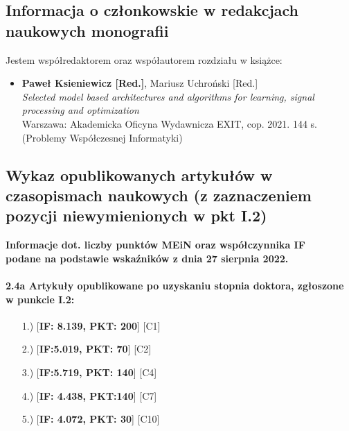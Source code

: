 \begin{fullwidth}
\subsection{Informacja o członkowskie w redakcjach naukowych monografii}

Jestem współredaktorem oraz współautorem rozdziału w książce:

\begin{itemize}
	\item \textbf{Paweł Ksieniewicz [Red.]}, Mariusz Uchroński [Red.]\\\emph{Selected model based architectures and algorithms for learning, signal processing and optimization}\\Warszawa: Akademicka Oficyna Wydawnicza EXIT, cop. 2021. 144 s. (Problemy Współczesnej Informatyki)
\end{itemize}

\subsection{Wykaz opublikowanych artykułów w czasopismach naukowych (z zaznaczeniem pozycji niewymienionych w pkt I.2)}
		
\begin{center}
	\bfseries Informacje dot. liczby punktów MEiN oraz współczynnika IF\\podane na podstawie wskaźników z dnia 27 sierpnia 2022.
\end{center}


\paragraph{2.4a Artykuły opublikowane po uzyskaniu stopnia doktora, zgłoszone w punkcie I.2:}

\begin{itemize}
	\item[1.)] [\textbf{IF: 8.139, PKT: 200}] [C1] \\\vspace{1em}
	\item[2.)] [\textbf{IF:5.019, PKT: 70}] [C2] \\\vspace{1em}
	\item[3.)] [\textbf{IF:5.719, PKT: 140}] [C4] \\\vspace{1em}
	\item[4.)] [\textbf{IF: 4.438, PKT:140}] [C7] \\\vspace{1em}
	\item[5.)] [\textbf{IF: 4.072, PKT: 30}] [C10] \\\vspace{1em}		
\end{itemize}



\end{fullwidth}
